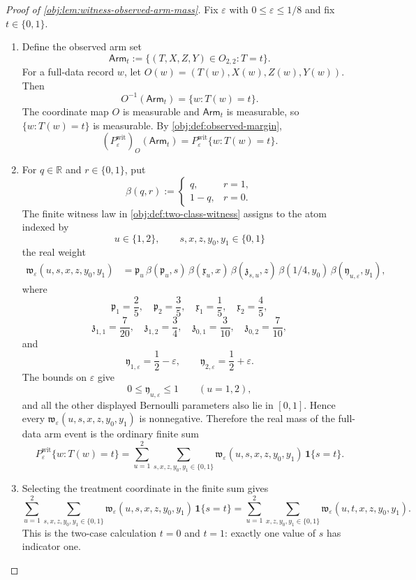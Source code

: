 \documentclass[11pt]{article}
\begin{document}
\begin{proof}[Proof of \cref{obj:lem:witness-observed-arm-mass}]
Fix \(\varepsilon\) with \(0\le\varepsilon\le 1/8\) and fix \(t\in\{0,1\}\).

\begin{enumerate}
\item Define the observed arm set
\[
\mathsf{Arm}_t:=\{(T,X,Z,Y)\in O_{2,2}:T=t\}.
\]
For a full-data record \(w\), let \(O(w)=(T(w),X(w),Z(w),Y(w))\).  Then
\[
O^{-1}(\mathsf{Arm}_t)=\{w:T(w)=t\}.
\]
The coordinate map \(O\) is measurable and \(\mathsf{Arm}_t\) is measurable, so \(\{w:T(w)=t\}\) is measurable.  By \cref{obj:def:observed-margin},
\[
(P_{\varepsilon}^{\mathrm{wit}})_O(\mathsf{Arm}_t)
=
P_{\varepsilon}^{\mathrm{wit}}\{w:T(w)=t\}.
\]

\item For \(q\in\mathbb R\) and \(r\in\{0,1\}\), put
\[
\beta(q,r):=
\begin{cases}
q, & r=1,\\
1-q, & r=0.
\end{cases}
\]
The finite witness law in \cref{obj:def:two-class-witness} assigns to the atom indexed by
\[
u\in\{1,2\},
\qquad
s,x,z,y_0,y_1\in\{0,1\}
\]
the real weight
\[
\begin{aligned}
\mathfrak w_{\varepsilon}(u,s,x,z,y_0,y_1)
&=
\mathfrak p_u\,
\beta(\mathfrak p_u,s)\,
\beta(\mathfrak x_u,x)\,
\beta(\mathfrak z_{s,u},z)\,
\beta(1/4,y_0)\,
\beta(\mathfrak y_{u,\varepsilon},y_1),
\end{aligned}
\]
where
\[
\mathfrak p_1=\frac25,\quad
\mathfrak p_2=\frac35,\quad
\mathfrak x_1=\frac15,\quad
\mathfrak x_2=\frac45,
\]
\[
\mathfrak z_{1,1}=\frac7{20},\quad
\mathfrak z_{1,2}=\frac34,\quad
\mathfrak z_{0,1}=\frac3{10},\quad
\mathfrak z_{0,2}=\frac7{10},
\]
and
\[
\mathfrak y_{1,\varepsilon}=\frac12-\varepsilon,\qquad
\mathfrak y_{2,\varepsilon}=\frac12+\varepsilon .
\]
The bounds on \(\varepsilon\) give
\[
0\le \mathfrak y_{u,\varepsilon}\le 1\qquad (u=1,2),
\]
and all the other displayed Bernoulli parameters also lie in \([0,1]\).  Hence every
\(\mathfrak w_{\varepsilon}(u,s,x,z,y_0,y_1)\) is nonnegative.  Therefore the real mass of the full-data arm event is the ordinary finite sum
\[
P_{\varepsilon}^{\mathrm{wit}}\{w:T(w)=t\}
=
\sum_{u=1}^{2}
\sum_{s,x,z,y_0,y_1\in\{0,1\}}
\mathfrak w_{\varepsilon}(u,s,x,z,y_0,y_1)\,\mathbf 1\{s=t\}.
\]

\item Selecting the treatment coordinate in the finite sum gives
\[
\sum_{u=1}^{2}
\sum_{s,x,z,y_0,y_1\in\{0,1\}}
\mathfrak w_{\varepsilon}(u,s,x,z,y_0,y_1)\,\mathbf 1\{s=t\}
=
\sum_{u=1}^{2}
\sum_{x,z,y_0,y_1\in\{0,1\}}
\mathfrak w_{\varepsilon}(u,t,x,z,y_0,y_1).
\]
This is the two-case calculation \(t=0\) and \(t=1\): exactly one value of \(s\) has indicator one.


\end{enumerate}
\end{proof}
\end{document}
